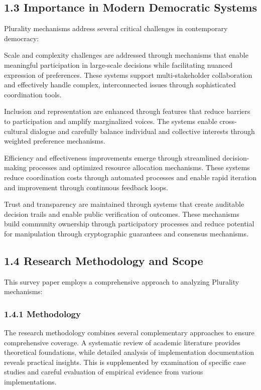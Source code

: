 \hypertarget{importance-in-modern-democratic-systems}{%
\subsection{1.3 Importance in Modern Democratic Systems}\label{importance-in-modern-democratic-systems}}

Plurality mechanisms address several critical challenges in contemporary democracy:

Scale and complexity challenges are addressed through mechanisms that enable meaningful participation in large-scale decisions while facilitating nuanced expression of preferences. These systems support multi-stakeholder collaboration and effectively handle complex, interconnected issues through sophisticated coordination tools.

Inclusion and representation are enhanced through features that reduce barriers to participation and amplify marginalized voices. The systems enable cross-cultural dialogue and carefully balance individual and collective interests through weighted preference mechanisms.

Efficiency and effectiveness improvements emerge through streamlined decision-making processes and optimized resource allocation mechanisms. These systems reduce coordination costs through automated processes and enable rapid iteration and improvement through continuous feedback loops.

Trust and transparency are maintained through systems that create auditable decision trails and enable public verification of outcomes. These mechanisms build community ownership through participatory processes and reduce potential for manipulation through cryptographic guarantees and consensus mechanisms.

\hypertarget{research-methodology-and-scope}{%
\subsection{1.4 Research Methodology and Scope}\label{research-methodology-and-scope}}

This survey paper employs a comprehensive approach to analyzing Plurality mechanisms:

\hypertarget{methodology}{%
\subsubsection{1.4.1 Methodology}\label{methodology}}

The research methodology combines several complementary approaches to ensure comprehensive coverage. A systematic review of academic literature provides theoretical foundations, while detailed analysis of implementation documentation reveals practical insights. This is supplemented by examination of specific case studies and careful evaluation of empirical evidence from various implementations.

